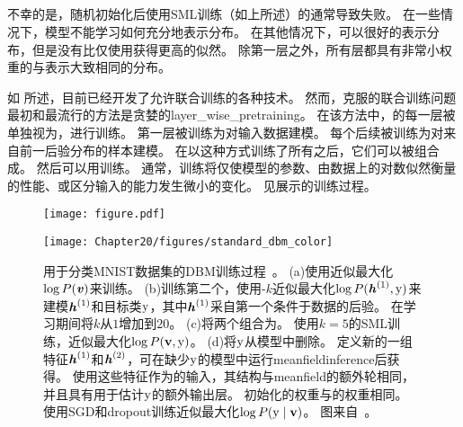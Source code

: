 \subsection{}
\label{sec:layer_wise_pretraining}

不幸的是，随机初始化后使用\gls{SML}训练（如上所述）的通常导致失败。
在一些情况下，模型不能学习如何充分地表示分布。
在其他情况下，可以很好的表示分布，但是没有比仅使用获得更高的似然。
除第一层之外，所有层都具有非常小权重的与表示大致相同的分布。

如 所述，目前已经开发了允许联合训练的各种技术。
然而，克服的联合训练问题最初和最流行的方法是贪婪的\gls{layer_wise_pretraining}。
在该方法中，的每一层被单独视为，进行训练。
第一层被训练为对输入数据建模。
每个后续被训练为对来自前一后验分布的样本建模。
在以这种方式训练了所有之后，它们可以被组合成。
然后可以用训练。
通常，训练将仅使模型的参数、由数据上的对数似然衡量的性能、或区分输入的能力发生微小的变化。
见展示的训练过程。

\begin{figure}[!htb]
\ifOpenSource
\centerline{\texttt{[image: figure.pdf]}}
\else
\centerline{\texttt{[image: Chapter20/figures/standard\_dbm\_color]}}
\fi
\caption{用于分类MNIST数据集的\gls{DBM}训练过程~\citep{SalHinton09,Srivastava14}。
(a)使用近似最大化$\log P(\boldsymbol{\mathit{v}})$来训练。
(b)训练第二个，使用-$k$近似最大化$\log P(\boldsymbol{\mathit{h}}^{(1)}, \mathrm{y})$来建模$\boldsymbol{\mathit{h}}^{(1)}$和目标类$\mathrm{y}$，其中$\boldsymbol{\mathit{h}}^{(1)}$采自第一个条件于数据的后验。 在学习期间将$k$从$1$增加到$20$。
(c)将两个组合为。
使用$k = 5$的\gls{SML}训练，近似最大化$\log P(\mathbf{v}, \mathrm{y})$。
(d)将$\mathrm{y}$从模型中删除。
定义新的一组特征$\boldsymbol{\mathit{h}}^{(1)}$和$\boldsymbol{\mathit{h}}^{(2)}$，可在缺少$\mathrm{y}$的模型中运行\gls{meanfield}\gls{inference}后获得。%
使用这些特征作为的输入，其结构与\gls{meanfield}的额外轮相同，并且具有用于估计$\mathrm{y}$的额外输出层。
初始化的权重与的权重相同。
使用\gls{SGD}和\gls{dropout}训练近似最大化$\log P(\mathrm{y} \mid \mathbf{v})$。
图来自~\citet{Goodfellow-et-al-NIPS2013}。
}
\label{fig:chap20_standard_dbm_color}
\end{figure}

